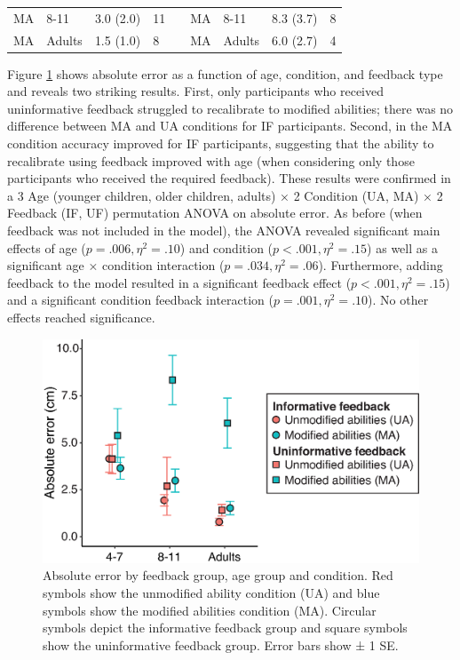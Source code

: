 \documentclass[a4paper,man,natbib,floatsintext,noextraspace]{apa6}
\begin{document}
\begin{table}
\begin{tabular}{@{}lllllllll@{}}
MA                              & 8-11                     & 3.0 (2.0)                            & 11                              &                       & MA                             & 8-11                     & 8.3 (3.7)                   & 8                      \\
MA                              & Adults                   & 1.5 (1.0)                            & 8                               &                       & MA                             & Adults                   & 6.0 (2.7)                   & 4                      \\ \bottomrule
\end{tabular}
\end{table}

Figure \ref{fig:feedback} shows absolute error as a function of age, condition, and feedback type and reveals two striking results. First, only participants who received uninformative feedback struggled to recalibrate to modified abilities; there was no difference between MA and UA conditions for IF participants. Second, in the MA condition accuracy improved for IF participants, suggesting that the ability to recalibrate using feedback improved with age (when considering only those participants who received the required feedback). These results were confirmed in a 3 Age (younger children, older children, adults) × 2 Condition (UA, MA) × 2 Feedback (IF, UF) permutation ANOVA on absolute error. As before (when feedback was not included in the model), the ANOVA revealed significant main effects of age ($p = .006, \eta^{2} = .10$) and condition ($p < .001, \eta^{2} = .15$) as well as a significant age × condition interaction ($p = .034, \eta^{2} = .06$). Furthermore, adding feedback to the model resulted in a significant feedback effect ($p < .001, \eta^{2} = .15$) and a significant condition feedback interaction ($p = .001, \eta^{2} = .10$). No other effects reached significance. 

\begin{figure}[htb!]
\centering
\includegraphics[width=.85\textwidth]{feedback.eps}
\caption{\label{fig:feedback}Absolute error by feedback group, age group and condition. Red symbols show the unmodified ability condition (UA) and blue symbols show the modified abilities condition (MA). Circular symbols depict the informative feedback group and square symbols show the uninformative feedback group. Error bars show ± 1 SE.}
\end{figure}
\end{document}
